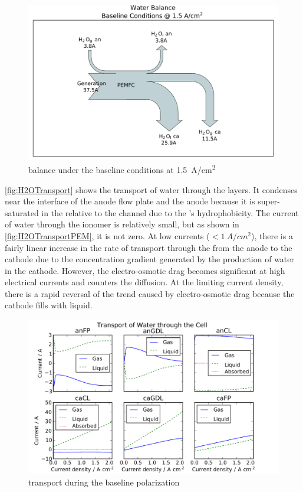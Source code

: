 \begin{figure}[htbp]
  \includegraphics[width=\linewidth]{Results/Cell/Model/1/Water}%
  \caption{ balance under the baseline conditions at \SI{1.5}{A/cm^2}}%
  \label{fig:BaselineWater}
\end{figure}

\autoref{fig:H2OTransport} shows the transport of water through the layers.  It condenses near the interface of the anode flow plate and the anode  because it is super-saturated in the  relative to the channel due to the 's hydrophobicity.  The current of water through the ionomer is relatively small, but as shown in \autoref{fig:H2OTransportPEM}, it is not zero.  At low currents ($<\SI{1}{A/cm^2}$), there is a fairly linear increase in the rate of transport through the  from the anode to the cathode due to the concentration gradient generated by the production of water in the cathode.  However, the electro-osmotic drag becomes significant at high electrical currents and counters the diffusion.  At the limiting current density, there is a rapid reversal of the trend caused by electro-osmotic drag because the cathode fills with liquid.

\begin{figure}[htbp]
  \includegraphics[width=\linewidth]{Results/Cell/Model/1/H2OTransport}%
  \caption{ transport during the baseline polarization}%
  \label{fig:H2OTransport}
\end{figure}

